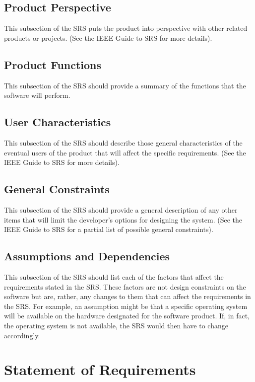 \documentclass{scrreprt}
\begin{document}
  \section{Product Perspective}

This subsection of the SRS puts the product into perspective with other related products or
projects.  (See the IEEE Guide to SRS for more details).

  \section{Product Functions}

This subsection of the SRS should provide a summary of the functions that the software will perform. 

  \section{User Characteristics}

This subsection of the SRS should describe those general characteristics of the eventual users of the product that will affect the specific requirements.  (See the IEEE Guide to SRS for more details).

  \section{General Constraints}

This subsection of the SRS should provide a general description of any other items that will
limit the developer’s options for designing the system. (See the IEEE Guide to SRS for a partial list of possible general constraints).

  \section{Assumptions and Dependencies}

This subsection of the SRS should list each of the factors that affect the requirements stated in the SRS. These factors are not design constraints on the software but are, rather, any changes to them that can affect the requirements in the SRS. For example, an assumption might be that a specific operating system will be available on the hardware designated for the software product. If, in fact, the operating system is not available, the SRS would then have to change accordingly.

\chapter{Statement of Requirements}  
\end{document}
